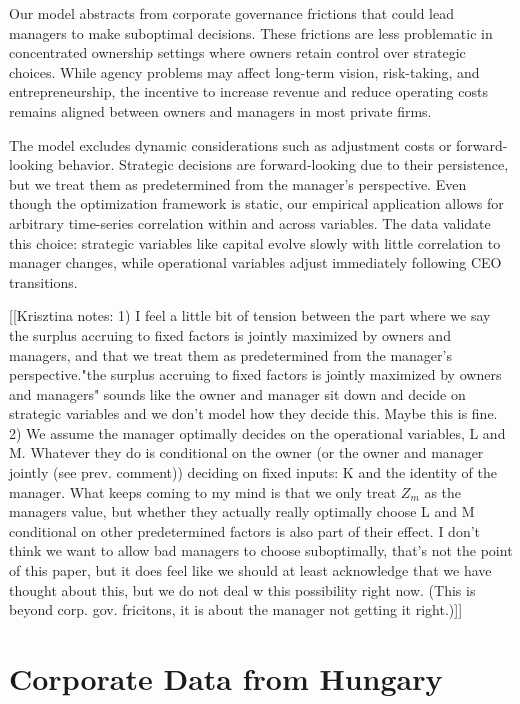 \documentclass[11pt,a4paper]{article}
\begin{document}
Our model abstracts from corporate governance frictions that could lead managers to make suboptimal decisions. These frictions are less problematic in concentrated ownership settings where owners retain control over strategic choices. While agency problems may affect long-term vision, risk-taking, and entrepreneurship, the incentive to increase revenue and reduce operating costs remains aligned between owners and managers in most private firms.

The model excludes dynamic considerations such as adjustment costs or forward-looking behavior. Strategic decisions are forward-looking due to their persistence, but we treat them as predetermined from the manager's perspective. Even though the optimization framework is static, our empirical application allows for arbitrary time-series correlation within and across variables. The data validate this choice: strategic variables like capital evolve slowly with little correlation to manager changes, while operational variables adjust immediately following CEO transitions.

[[Krisztina notes: 1) I feel a little bit of tension between the part where we say the surplus accruing to fixed factors is jointly maximized by owners and managers, and that we treat them as predetermined from the manager's perspective."the surplus accruing to fixed factors is jointly maximized by owners and managers" sounds like the owner and manager sit down and decide on strategic variables and we don't model how they decide this. Maybe this is fine.
2) We assume the manager optimally decides on the operational variables, L and M. Whatever they do is conditional on the owner (or the owner and manager jointly (see prev. comment)) deciding on fixed inputs: K and the identity of the manager. What keeps coming to my mind is that we only treat $Z_m$ as the managers value, but whether they actually really optimally choose L and M conditional on other predetermined factors is also part of their effect. I don't think we want to allow bad managers to choose suboptimally, that's not the point of this paper, but it does feel like we should at least acknowledge that we have thought about this, but we do not deal w this possibility right now. (This is beyond corp. gov. fricitons, it is about the manager not getting it right.)]]

\section{Corporate Data from Hungary}
\end{document}
